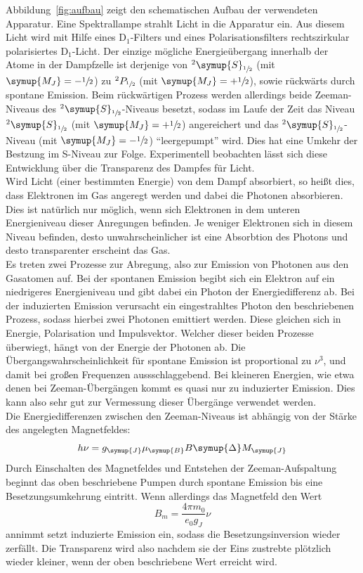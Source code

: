 Abbildung~\ref{fig:aufbau} zeigt den schematischen Aufbau der verwendeten
Apparatur. Eine Spektrallampe strahlt Licht in die Apparatur ein. Aus diesem
Licht wird mit Hilfe eines $\text{D}_1$-Filters und eines Polarisationsfilters
rechtszirkular polarisiertes $\text{D}_1$-Licht. Der einzige mögliche
Energieübergang innerhalb der Atome in der Dampfzelle ist derjenige von
$^2\symup{S}_{\sfrac{1}{2}}$ (mit $\symup{M_J}=-\sfrac{1}{2}$) zu
$^2P_{\sfrac{1}{2}}$ (mit $\symup{M_J}=+\sfrac{1}{2}$), sowie rückwärts durch
spontane Emission. Beim rückwärtigen Prozess werden allerdings beide
Zeeman-Niveaus des $^2\symup{S}_{\sfrac{1}{2}}$-Niveaus besetzt, sodass im
Laufe der Zeit das Niveau $^2\symup{S}_{\sfrac{1}{2}}$ (mit
$\symup{M_J}=+\sfrac{1}{2}$) angereichert und das
$^2\symup{S}_{\sfrac{1}{2}}$-Niveau (mit $\symup{M_J}=-\sfrac{1}{2}$)
\enquote{leergepumpt} wird. Dies hat eine Umkehr der Bestzung im S-Niveau zur
Folge. Experimentell beobachten lässt sich diese Entwicklung über die
Transparenz des Dampfes für Licht. \\
Wird Licht (einer bestimmten Energie) von dem Dampf absorbiert, so heißt dies,
dass Elektronen im Gas angeregt werden und dabei die Photonen absorbieren. Dies
ist natürlich nur möglich, wenn sich Elektronen in dem unteren Energieniveau
dieser Anregungen befinden. Je weniger Elektronen sich in diesem Niveau
befinden, desto unwahrscheinlicher ist eine Absorbtion des Photons und desto
transparenter erscheint das Gas. \\
Es treten zwei Prozesse zur Abregung, also zur Emission von Photonen aus den
Gasatomen auf. Bei der spontanen Emission begibt sich ein Elektron auf
ein niedrigeres Energieniveau und gibt dabei ein Photon der Energiedifferenz
ab. Bei der induzierten Emission verursacht ein eingestrahltes Photon
den beschriebenen Prozess, sodass hierbei zwei Photonen emittiert werden. Diese
gleichen sich in Energie, Polarisation und Impulsvektor. Welcher dieser beiden
Prozesse überwiegt, hängt von der Energie der Photonen ab. Die
Übergangswahrscheinlichkeit für spontane Emission ist proportional zu $\nu^3$,
und damit bei großen Frequenzen aussschlaggebend. Bei kleineren Energien, wie
etwa denen bei Zeeman-Übergängen kommt es quasi nur zu induzierter Emission.
Dies kann also sehr gut zur Vermessung dieser Übergänge verwendet werden. \\
Die Energiedifferenzen zwischen den Zeeman-Niveaus ist abhängig von der Stärke
des angelegten Magnetfeldes:
%
\begin{equation}
  h\nu=g_{\symup{J}}\mu_{\symup{B}}B\symup{\Delta}M_{\symup{J}}
  \label{eq:übergangsenergie}
\end{equation}
%
Durch Einschalten des Magnetfeldes und Entstehen der Zeeman-Aufspaltung beginnt
das oben beschriebene Pumpen durch spontane Emission bis eine
Besetzungsumkehrung eintritt. Wenn allerdings das Magnetfeld den Wert
%
\begin{equation}
  B_m=\frac{4\pi m_0}{e_0g_J}\nu
\end{equation}
%
annimmt setzt induzierte Emission ein, sodass die Besetzungsinversion wieder
zerfällt. Die Transparenz wird also nachdem sie der Eins zustrebte plötzlich
wieder kleiner, wenn der oben beschriebene Wert erreicht wird.
